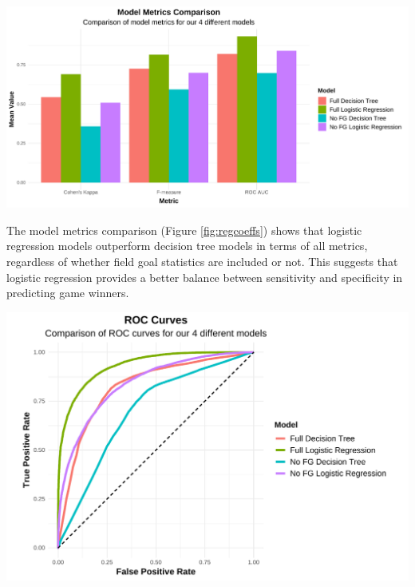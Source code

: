 \documentclass[
  12pt,
  a4paper,
]{article}
\let\origfigure\figure
\let\endorigfigure\endfigure
\renewenvironment{figure}[1][2] {
    \expandafter\origfigure\expandafter[H]
} {
    \endorigfigure
}
\begin{document}
\begin{figure}

{\centering \includegraphics[width=1\linewidth]{latex/plots/plot_12} 

}

\caption{Comparison of model metrics for 4 different models}\label{fig:metricsplot}
\end{figure}

The model metrics comparison (Figure \ref{fig:regcoeffs}) shows that logistic regression models outperform decision tree models in terms of all metrics, regardless of whether field goal statistics are included or not. This suggests that logistic regression provides a better balance between sensitivity and specificity in predicting game winners.

\begin{figure}

{\centering \includegraphics[width=1\linewidth]{latex/plots/plot_13} 

}

\caption{Comparison of ROC curves for 4 different models}\label{fig:roccurve}
\end{figure}
\end{document}
